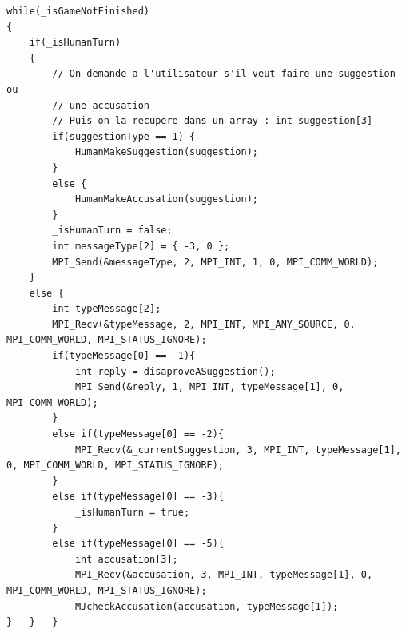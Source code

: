 \documentclass[a4paper,10pt]{article}
\begin{document}
				
		
		
		\begin{lstlisting}
while(_isGameNotFinished)
{
	if(_isHumanTurn)
	{
		// On demande a l'utilisateur s'il veut faire une suggestion ou 
		// une accusation
		// Puis on la recupere dans un array : int suggestion[3]
		if(suggestionType == 1) {
			HumanMakeSuggestion(suggestion);
		}
		else {
			HumanMakeAccusation(suggestion);
		}
		_isHumanTurn = false;
		int messageType[2] = { -3, 0 };
		MPI_Send(&messageType, 2, MPI_INT, 1, 0, MPI_COMM_WORLD);
	} 
	else {
		int typeMessage[2];
		MPI_Recv(&typeMessage, 2, MPI_INT, MPI_ANY_SOURCE, 0, MPI_COMM_WORLD, MPI_STATUS_IGNORE);
		if(typeMessage[0] == -1){
			int reply = disaproveASuggestion();
			MPI_Send(&reply, 1, MPI_INT, typeMessage[1], 0, MPI_COMM_WORLD);
		}
		else if(typeMessage[0] == -2){
			MPI_Recv(&_currentSuggestion, 3, MPI_INT, typeMessage[1], 0, MPI_COMM_WORLD, MPI_STATUS_IGNORE);		
		}
		else if(typeMessage[0] == -3){
			_isHumanTurn = true;
		}
		else if(typeMessage[0] == -5){
			int accusation[3];
			MPI_Recv(&accusation, 3, MPI_INT, typeMessage[1], 0, MPI_COMM_WORLD, MPI_STATUS_IGNORE);
			MJcheckAccusation(accusation, typeMessage[1]);
}	}	}
\end{lstlisting}
\fontfamily{}	
	
	
\end{document}
